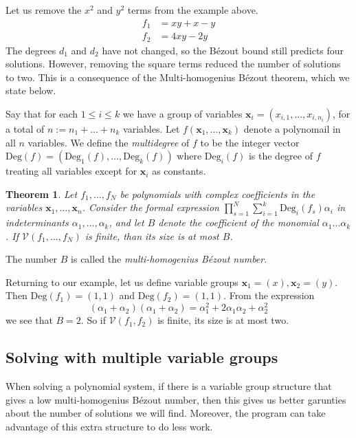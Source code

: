\documentclass[12pt]{article}
\newtheorem{theorem}{Theorem}[section]
\theoremstyle{definition}
\newcommand{\Deg}{\text{Deg}}
\begin{document}
Let us remove the $x^2$ and $y^2$ terms from the example above.
\begin{align*}
    f_1 &= xy + x - y\\
    f_2 &= 4xy - 2y
\end{align*}
The degrees $d_1$ and $d_2$ have not changed, so the B\'{e}zout bound 
still predicts four solutions. However, removing the square terms 
reduced the number of solutions to two. This is a consequence of the 
Multi-homogenius B\'{e}zout theorem, which we state below.

Say that for each $1 \leq i \leq k$ we have a group of variables 
$\mathbf{x}_i = (x_{i,1}, \ldots, x_{i,n_i})$, for a total of $n := n_1 
+ \ldots + n_k$ variables. Let $f(\mathbf{x}_1, \ldots, 
\mathbf{x}_k)$ denote a polynomail in all $n$ variables. We define the 
\emph{multidegree} of $f$ to be the integer vector $\Deg(f) = 
(\Deg_1(f), \ldots, \Deg_k(f))$ where $\Deg_i(f)$ is the degree of $f$ 
treating all variables except for $\mathbf{x}_i$ as constants.

\begin{theorem}
Let $f_1, \ldots, f_N$ be polynomials with complex coefficients in the 
   variables $\mathbf{x}_1, 
\ldots, \mathbf{x}_n$. Consider the formal expression $\prod_{s = 1}^N 
\sum_{i = 1}^{k} \Deg_i(f_s) \alpha_i$ in indeterminants $\alpha_1, 
\ldots, \alpha_k$, and let $B$ denote the coefficient of the monomial 
$\alpha_1\ldots \alpha_k$. If $\mathcal{V}(f_1, \ldots, f_N)$ is finite, 
than its size is at most $B$.
\end{theorem}

The number $B$ is called the \emph{multi-homogenius B\'{e}zout number}.

Returning to our example, let us define variable groups $\mathbf{x}_1 = 
(x), \mathbf{x}_2 = (y)$. Then $\Deg(f_1) = (1,1)$ and $\Deg(f_2) = 
(1,1)$. From the expression
\[
    (\alpha_1 + \alpha_2)(\alpha_1 + \alpha_2) = \alpha_1^2 + 
   2\alpha_1\alpha_2 + \alpha_2^2
\]
we see that $B = 2$. So if $\mathcal{V}(f_1, f_2)$ is finite, its size is 
at most two.

\subsection{Solving with multiple variable groups}
When solving a polynomial system, if there is a variable group structure 
that gives a low multi-homogenius B\'{e}zout number, then this 
gives us better garunties about the number of solutions we will find. 
Moreover, the program can take advantage of this extra structure to do 
less work.
\end{document}
